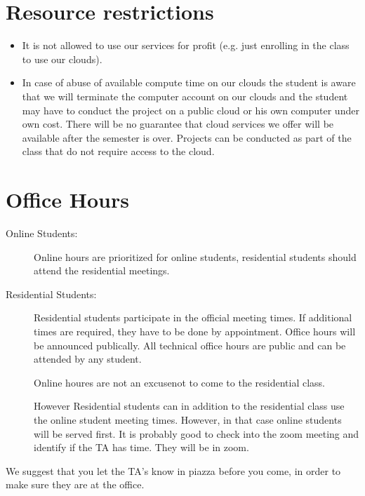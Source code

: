 \section{Resource restrictions}

\begin{itemize}
\item It is not allowed to use our services for profit (e.g. just
  enrolling in the class to use our clouds).
\item In case of abuse of available compute time on our clouds the
  student is aware that we will terminate the computer account on our
  clouds and the student may have to conduct the project on a public cloud or
  his own computer under own cost. There will be no guarantee that
  cloud services we offer will be available after the semester is
  over.  Projects can be conducted as part of the class that do not
  require access to the cloud.
\end{itemize}

\section{Office Hours}\label{office-hours}

\begin{description}

\item[Online Students:] Online hours are prioritized for online students,
  residential students should attend the residential meetings. 

\item[Residential Students:] Residential students participate in the
  official meeting times. If additional times are required, they have
  to be done by appointment. Office hours will be announced
  publically. All technical office hours are public and can be
  attended by any student.

  Online houres are not an excusenot to come to the residential class.

  However Residential students can in addition to the residential
  class use the online student meeting times.  However, in that case
  online students will be served first. It is probably good to check
  into the zoom meeting and identify if the TA has time. They will be
  in zoom.

\end{description}

We suggest that you let the TA's know in piazza before you come, in order to make
sure they are at the office.

